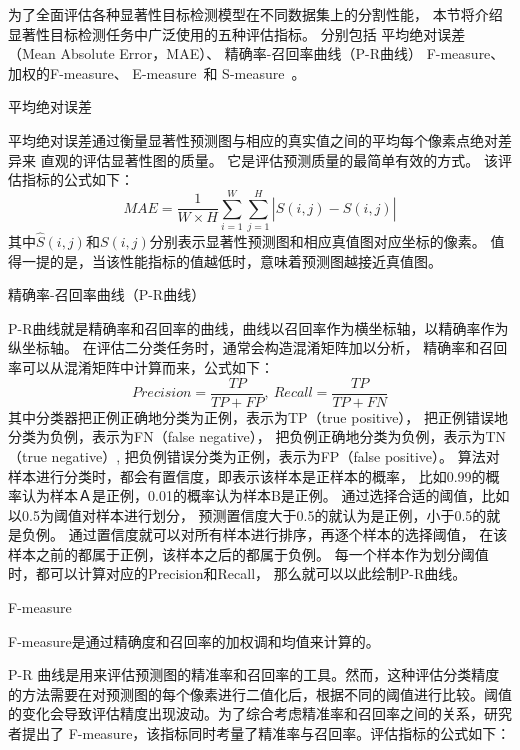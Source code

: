 %
%
为了全面评估各种显著性目标检测模型在不同数据集上的分割性能，
本节将介绍显著性目标检测任务中广泛使用的五种评估指标。
分别包括
平均绝对误差（Mean Absolute Error，MAE）、
精确率-召回率曲线（P-R曲线）
F-measure\cite{achanta2009frequency}、
加权的F-measure\cite{margolin2014evaluate}、
E-measure~\cite{fan2018enhanced}和
S-measure~\cite{fan2017structure}。\par
%
%
%
%
%
%
平均绝对误差\par
平均绝对误差通过衡量显著性预测图与相应的真实值之间的平均每个像素点绝对差异来
直观的评估显著性图的质量。
它是评估预测质量的最简单有效的方式。
该评估指标的公式如下：
\begin{equation}
	MAE=\frac{1}{W \times H}\sum_{i=1}^{W} \sum_{j=1}^{H} \left |  \hat{S} (i,j) - S(i,j)\right | 
\end{equation}
%
%
其中$\hat{S}(i,j)$和$S(i,j)$分别表示显著性预测图和相应真值图对应坐标的像素。
值得一提的是，当该性能指标的值越低时，意味着预测图越接近真值图。\par
%
%
%
精确率-召回率曲线（P-R曲线）\par
P-R曲线就是精确率和召回率的曲线，曲线以召回率作为横坐标轴，以精确率作为纵坐标轴。
在评估二分类任务时，通常会构造混淆矩阵加以分析，
精确率和召回率可以从混淆矩阵中计算而来，公式如下：
%
%
\begin{equation}
	Precision = \frac{TP}{TP + FP},~Recall = \frac{TP}{TP+FN}
\end{equation}
%
%
其中分类器把正例正确地分类为正例，表示为TP（true positive），
把正例错误地分类为负例，表示为FN（false negative），
把负例正确地分类为负例，表示为TN（true negative）,
把负例错误分类为正例，表示为FP（false positive）。
算法对样本进行分类时，都会有置信度，即表示该样本是正样本的概率，
比如0.99的概率认为样本Ａ是正例，0.01的概率认为样本B是正例。
通过选择合适的阈值，比如以0.5为阈值对样本进行划分，
预测置信度大于0.5的就认为是正例，小于0.5的就是负例。
通过置信度就可以对所有样本进行排序，再逐个样本的选择阈值，
在该样本之前的都属于正例，该样本之后的都属于负例。
每一个样本作为划分阈值时，都可以计算对应的Precision和Recall，
那么就可以以此绘制P-R曲线。\par
%
%
%
%
F-measure\par
F-measure是通过精确度和召回率的加权调和均值来计算的。


P-R 曲线是用来评估预测图的精准率和召回率的工具。然而，这种评估分类精度的方法需要在对预测图的每个像素进行二值化后，根据不同的阈值进行比较。阈值的变化会导致评估精度出现波动。为了综合考虑精准率和召回率之间的关系，研究者提出了 F-measure，该指标同时考量了精准率与召回率。评估指标的公式如下：

